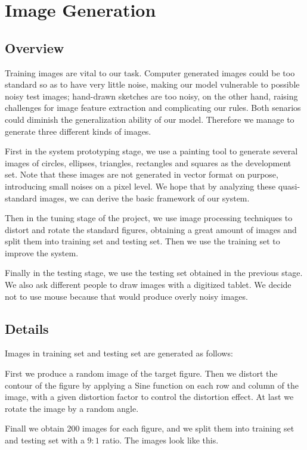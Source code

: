 \section{Image Generation}

\subsection{Overview}

Training images are vital to our task. Computer generated images could be too standard so as to have very little noise, making our model vulnerable to possible noisy test images; hand-drawn sketches are too noisy, on the other hand, raising challenges for image feature extraction and complicating our rules. Both senarios could diminish the generalization ability of our model. Therefore we manage to generate three different kinds of images.

First in the system prototyping stage, we use a painting tool to generate several images of circles, ellipses, triangles, rectangles and squares as the development set. Note that these images are not generated in vector format on purpose, introducing small noises on a pixel level. We hope that by analyzing these quasi-standard images, we can derive the basic framework of our system.

Then in the tuning stage of the project, we use image processing techniques to distort and rotate the standard figures, obtaining a great amount of images and split them into training set and testing set. Then we use the training set to improve the system.

Finally in the testing stage, we use the testing set obtained in the previous stage. We also ask different people to draw images with a digitized tablet. We decide not to use mouse because that would produce overly noisy images.

\subsection{Details}

Images in training set and testing set are generated as follows:

First we produce a random image of the target figure. Then we distort the contour of the figure by applying a Sine function on each row and column of the image, with a given distortion factor to control the distortion effect. At last we rotate the image by a random angle.

Finall we obtain 200 images for each figure, and we split them into training set and testing set with a $9:1$ ratio.  The images look like this.


